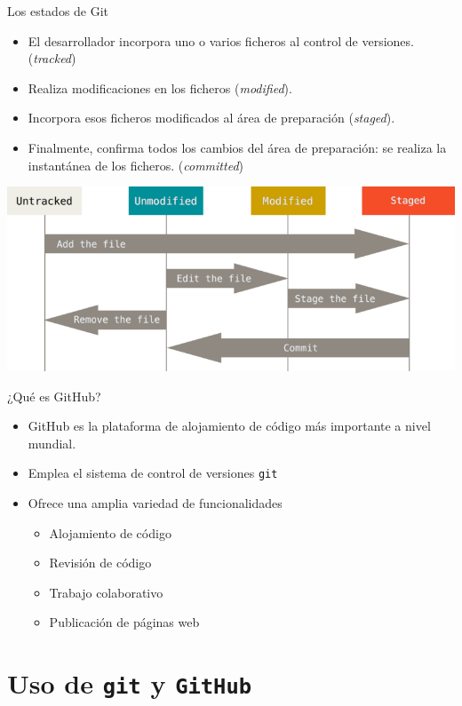 \documentclass[aspectratio=169, xcolor={usenames,svgnames,dvipsnames}]{beamer}
\begin{document}
\begin{frame}[label={sec:org218a549}]{Los estados de Git}
\begin{itemize}
\item El desarrollador incorpora uno o varios ficheros al control de versiones. (\emph{tracked})
\item Realiza modificaciones en los ficheros (\emph{modified}).
\item Incorpora esos ficheros modificados al área de preparación (\emph{staged}).
\item Finalmente, confirma todos los cambios del área de preparación: se realiza la instantánea de los ficheros. (\emph{committed})
\end{itemize}
\begin{center}
\includegraphics[height=0.4\textheight]{figs/git_estados.png}
\end{center}
\end{frame}

\begin{frame}[label={sec:org9369b6d},fragile]{¿Qué es GitHub?}
 \begin{itemize}
\item GitHub es la plataforma de alojamiento de código más importante a nivel mundial.
\item Emplea el sistema de control de versiones \texttt{git}
\item Ofrece una amplia variedad de funcionalidades
\begin{itemize}
\item Alojamiento de código
\item Revisión de código
\item Trabajo colaborativo
\item Publicación de páginas web
\end{itemize}
\end{itemize}
\end{frame}

\section{Uso de \texttt{git} y \texttt{GitHub}}
\label{sec:org2dc3d74}
\end{document}

